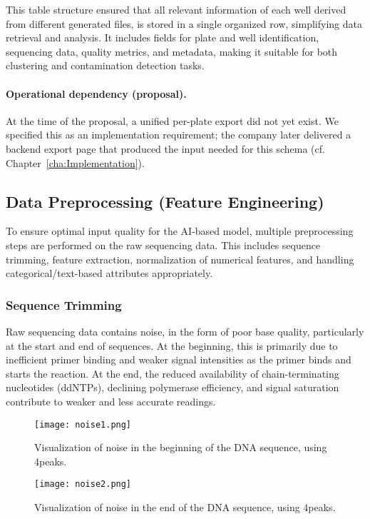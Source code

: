 This table structure ensured that all relevant information of each well derived from different generated files, is stored in a single organized row, simplifying data retrieval and analysis. It includes fields for plate and well identification, sequencing data, quality metrics, and metadata, making it suitable for both clustering and contamination detection tasks.

\paragraph{Operational dependency (proposal).}
At the time of the proposal, a unified per-plate export did not yet exist. We specified this as an implementation requirement; the company later delivered a backend export page that produced the input needed for this schema (cf. Chapter~\ref{cha:Implementation}).

\subsection{Data Preprocessing (Feature Engineering)}

To ensure optimal input quality for the AI-based model, multiple preprocessing steps are performed on the raw sequencing data. This includes sequence trimming, feature extraction, normalization of numerical features, and handling categorical/text-based attributes appropriately.

\subsubsection{Sequence Trimming}
Raw sequencing data contains noise, in the form of poor base quality, particularly at the start and end of sequences. At the beginning, this is primarily due to inefficient primer binding and weaker signal intensities as the primer binds and starts the reaction. At the end, the reduced availability of chain-terminating nucleotides (ddNTPs), declining polymerase efficiency, and signal saturation contribute to weaker and less accurate readings. \cite{sanger_method_original}

\begin{figure}[h]
  \centering
  \texttt{[image: noise1.png]}
  \caption{Visualization of noise in the beginning of the DNA sequence, using 4peaks.}
  \label{fig:noise1}
\end{figure}

\begin{figure}[h]
  \centering
  \texttt{[image: noise2.png]}
  \caption{Visualization of noise in the end of the DNA sequence, using 4peaks.}
  \label{fig:noise2}
\end{figure}

